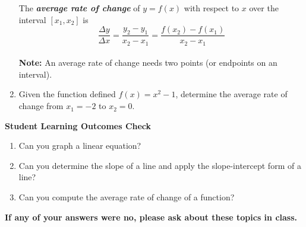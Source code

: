 \begin{enumerate}
 The \textbf{\emph{average rate of change}} of $y=f(x)$ with respect to $x$ over the interval $[x_1,x_2]$ is
 $$\frac{\Delta y}{\Delta x}=\frac{y_2-y_1}{x_2-x_1}=\frac{f(x_2)-f(x_1)}{x_2-x_1}$$\\ 
 
\noindent \textbf{Note:  }An average rate of change needs two points (or endpoints on an interval). 






\item Given the function defined $f(x)=x^2-1$, determine the average rate of change from $x_1=-2$ to $x_2=0.$\\[2in]


\end{enumerate}

\noindent \textbf{Student Learning Outcomes Check}

\begin{enumerate}
\item Can you graph a linear equation?
\item Can you determine the slope of a line and apply the slope-intercept form of a line?
\item Can you compute the average rate of change of a function?
\end{enumerate}

\noindent \textbf{If any of your answers were no, please ask about these topics in class.}

